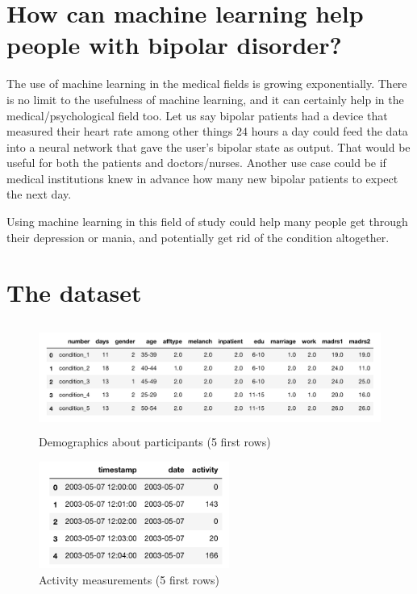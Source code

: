 \section{How can machine learning help people with bipolar disorder?}
The use of machine learning in the medical fields is growing exponentially. There is no limit to the usefulness of machine learning, and it can certainly help in the medical/psychological field too. Let us say bipolar patients had a device that measured their heart rate among other things 24 hours a day could feed the data into a neural network that gave the user's bipolar state as output. That would be useful for both the patients and doctors/nurses. Another use case could be if medical institutions knew in advance how many new bipolar patients to expect the next day. 

Using machine learning in this field of study could help many people get through their depression or mania, and potentially get rid of the condition altogether.

\section{The dataset}

\begin{figure}
    \begin{center}
        \includegraphics[height=3.5cm]{img/demographics.png}
        \caption{Demographics about participants (5 first rows)}
        \label{figure:demographics}
    \end{center}
\end{figure}

\begin{figure}
    \begin{center}
        \includegraphics[height=3.5cm]{img/participant.png}
        \caption{Activity measurements (5 first rows)}
        \label{figure:participant_activity}
    \end{center}
\end{figure}


